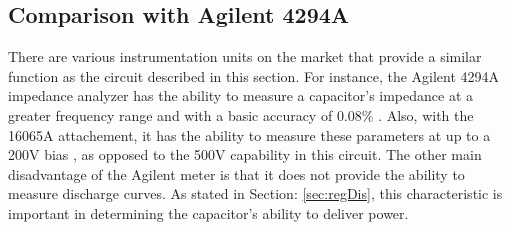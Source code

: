 \subsection{Comparison with Agilent 4294A}

There are various instrumentation units on the market that provide a similar function as the circuit described in this section. For instance, the Agilent 4294A impedance analyzer has the ability to measure a capacitor's impedance at a greater frequency range and with a basic accuracy of $0.08\%$ \cite{agilent_4294A}. Also, with the 16065A attachement, it has the ability to measure these parameters at up to a 200V bias \cite{agilent_16065A}, as opposed to the 500V capability in this circuit. The other main disadvantage of the Agilent meter is that it does not provide the ability to measure discharge curves. As stated in Section: \ref{sec:regDis}, this characteristic is important in determining the capacitor's ability to deliver power.


